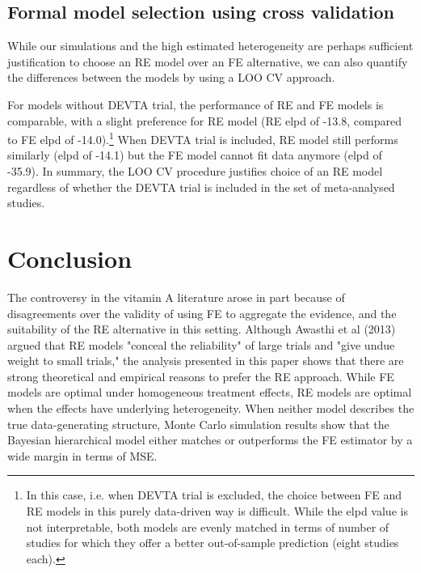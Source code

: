 \documentclass[12pt]{article}
\begin{document}
\subsection{Formal model selection using cross validation}

While our simulations and the high estimated heterogeneity are perhaps sufficient justification to choose an RE model over an FE alternative, we can also quantify the differences between the models by using a LOO CV approach.

For models without DEVTA trial, the performance of RE and FE models is comparable, with a slight preference for RE model (RE elpd of -13.8, compared to FE elpd of -14.0).\footnote{In this case, i.e. when DEVTA trial is excluded, the choice between FE and RE models in this purely data-driven way is difficult. While the elpd value is not interpretable, both models are evenly matched in terms of number of studies for which they offer a better out-of-sample prediction (eight studies each).} When DEVTA trial is included, RE model still performs similarly (elpd of -14.1) but the FE model cannot fit data anymore (elpd of -35.9). In summary, the LOO CV procedure justifies choice of an RE model regardless of whether the DEVTA trial is included in the set of meta-analysed studies.




\section{Conclusion}

The controversy in the vitamin A literature arose in part because of disagreements over the validity of using FE to aggregate the evidence, and the suitability of the RE alternative in this setting. Although Awasthi et al (2013) argued that RE models "conceal the reliability" of large trials and "give undue weight to small trials," the analysis presented in this paper shows that there are strong theoretical and empirical reasons to prefer the RE approach. While FE models are optimal under homogeneous treatment effects, RE models are optimal when the effects have underlying heterogeneity. When neither model describes the true data-generating structure, Monte Carlo simulation results show that the Bayesian hierarchical model either matches or outperforms the FE estimator by a wide margin in terms of MSE.
\end{document}
